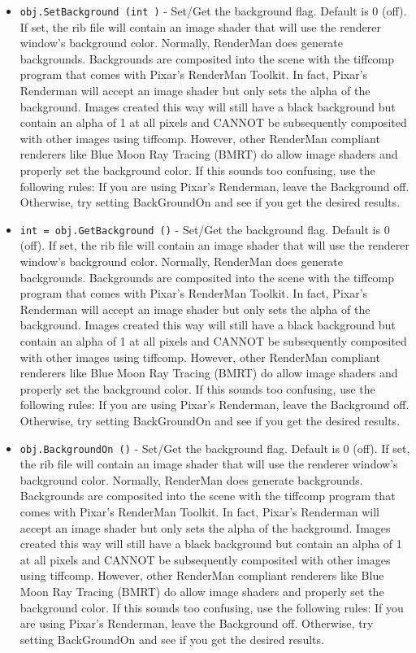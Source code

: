 \begin{itemize}
\item  \verb|obj.SetBackground (int )| -  Set/Get the background flag. Default is 0 (off).
 If set, the rib file will contain an
 image shader that will use the renderer window's background
 color. Normally, RenderMan does generate backgrounds. Backgrounds are
 composited into the scene with the tiffcomp program that comes with
 Pixar's RenderMan Toolkit.  In fact, Pixar's Renderman will accept an
 image shader but only sets the alpha of the background. Images created
 this way will still have a black background but contain an alpha of 1
 at all pixels and CANNOT be subsequently composited with other images
 using tiffcomp.  However, other RenderMan compliant renderers like
 Blue Moon Ray Tracing (BMRT) do allow image shaders and properly set
 the background color. If this sounds too confusing, use the following
 rules: If you are using Pixar's Renderman, leave the Background
 off. Otherwise, try setting BackGroundOn and see if you get the
 desired results.

\item  \verb|int = obj.GetBackground ()| -  Set/Get the background flag. Default is 0 (off).
 If set, the rib file will contain an
 image shader that will use the renderer window's background
 color. Normally, RenderMan does generate backgrounds. Backgrounds are
 composited into the scene with the tiffcomp program that comes with
 Pixar's RenderMan Toolkit.  In fact, Pixar's Renderman will accept an
 image shader but only sets the alpha of the background. Images created
 this way will still have a black background but contain an alpha of 1
 at all pixels and CANNOT be subsequently composited with other images
 using tiffcomp.  However, other RenderMan compliant renderers like
 Blue Moon Ray Tracing (BMRT) do allow image shaders and properly set
 the background color. If this sounds too confusing, use the following
 rules: If you are using Pixar's Renderman, leave the Background
 off. Otherwise, try setting BackGroundOn and see if you get the
 desired results.

\item  \verb|obj.BackgroundOn ()| -  Set/Get the background flag. Default is 0 (off).
 If set, the rib file will contain an
 image shader that will use the renderer window's background
 color. Normally, RenderMan does generate backgrounds. Backgrounds are
 composited into the scene with the tiffcomp program that comes with
 Pixar's RenderMan Toolkit.  In fact, Pixar's Renderman will accept an
 image shader but only sets the alpha of the background. Images created
 this way will still have a black background but contain an alpha of 1
 at all pixels and CANNOT be subsequently composited with other images
 using tiffcomp.  However, other RenderMan compliant renderers like
 Blue Moon Ray Tracing (BMRT) do allow image shaders and properly set
 the background color. If this sounds too confusing, use the following
 rules: If you are using Pixar's Renderman, leave the Background
 off. Otherwise, try setting BackGroundOn and see if you get the
 desired results.


\end{itemize}
